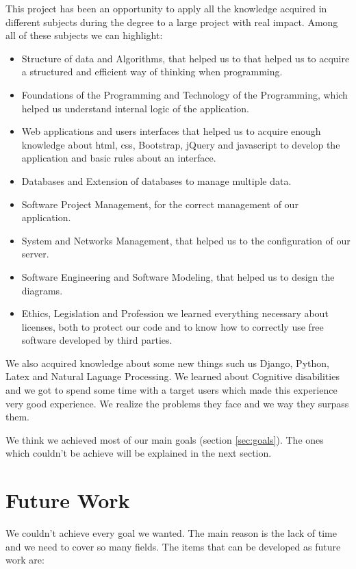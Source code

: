 This project has been an opportunity to apply all the knowledge acquired
in different subjects during the degree to a large project with real impact.
Among all of these subjects we can highlight:

\begin{itemize}
	\item Structure of data and Algorithms, that helped us to that helped us to
	acquire a structured and efficient way of thinking when programming.
	\item Foundations of the Programming and Technology of the Programming, which helped us understand internal logic of the application.
	\item Web applications and users interfaces that helped us to acquire enough knowledge about html, css, Bootstrap, jQuery and javascript to develop the application and basic rules about an interface.
	\item Databases and Extension of databases to manage multiple data.
	\item Software Project Management, for the correct management of our application.
	\item System and Networks Management, that helped us to the configuration of our server.
	\item Software Engineering and Software Modeling, that helped us to design the diagrams.
	\item Ethics, Legislation and Profession we learned everything necessary about licenses, both to protect our code
	and to know how to correctly use free software developed by third
	parties.
\end{itemize}

We also acquired knowledge about some new things such us Django, Python, Latex and Natural Laguage Processing. We learned about Cognitive disabilities and we got to spend some time with a target users which made this experience very good experience. We realize the problems they face and we way they surpass them.

We think we achieved most of our main goals (section \ref{sec:goals}). The ones which couldn't be achieve will be explained in the next section.

\section{Future Work}
\label{sec:future_work}

We couldn't achieve every goal we wanted. The main reason is the lack of time and we need to cover so many fields. The items that can be developed as future work are:

